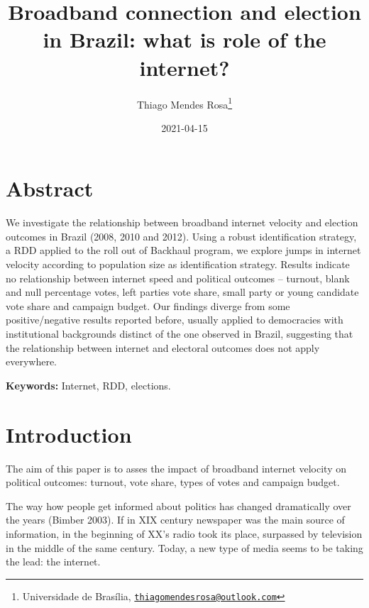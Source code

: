 \documentclass[
  12pt,
]{article}
\title{Broadband connection and election in Brazil: what is role of the
internet?}
\author{Thiago Mendes Rosa\footnote{Universidade de Brasília,
  \href{mailto:thiagomendesrosa@outlook.com}{\nolinkurl{thiagomendesrosa@outlook.com}}}}
\date{2021-04-15}
\begin{document}
\maketitle

\let\oldthebibliography\thebibliography
\let\endoldthebibliography\endthebibliography
\renewenvironment{thebibliography}[1]{
  \begin{oldthebibliography}{#1}
    \setlength{\itemsep}{0em}
    \setlength{\parskip}{0em}
}
{
  \end{oldthebibliography}
}

\allsectionsfont{\centering}

\hypertarget{abstract}{%
\section*{Abstract}\label{abstract}}

We investigate the relationship between broadband internet velocity and
election outcomes in Brazil (2008, 2010 and 2012). Using a robust
identification strategy, a RDD applied to the roll out of Backhaul
program, we explore jumps in internet velocity according to population
size as identification strategy. Results indicate no relationship
between internet speed and political outcomes -- turnout, blank and null
percentage votes, left parties vote share, small party or young
candidate vote share and campaign budget. Our findings diverge from some
positive/negative results reported before, usually applied to
democracies with institutional backgrounds distinct of the one observed
in Brazil, suggesting that the relationship between internet and
electoral outcomes does not apply everywhere.

\textbf{Keywords:} Internet, RDD, elections.

\allsectionsfont{\raggedright}

\clearpage

\hypertarget{introduction}{%
\section*{Introduction}\label{introduction}}

The aim of this paper is to asses the impact of broadband internet
velocity on political outcomes: turnout, vote share, types of votes and
campaign budget.

The way how people get informed about politics has changed dramatically
over the years (Bimber 2003). If in XIX century newspaper was the main
source of information, in the beginning of XX's radio took its place,
surpassed by television in the middle of the same century. Today, a new
type of media seems to be taking the lead: the internet.
\end{document}
